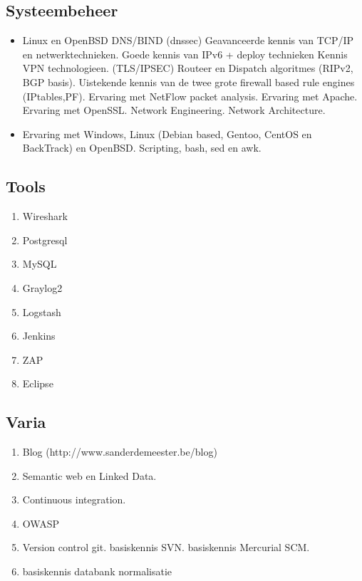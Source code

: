 \documentclass[margin, 10pt]{res} %
\begin{document}
\subsection{Systeembeheer}
\begin{itemize}
\item Linux en OpenBSD
\subitem DNS/BIND (dnssec)
\subitem Geavanceerde kennis van TCP/IP en netwerktechnieken.
\subitem Goede kennis van IPv6 + deploy technieken
\subitem Kennis VPN technologieen. (TLS/IPSEC)
\subitem Routeer en Dispatch algoritmes (RIPv2, BGP basis).
\subitem Uistekende kennis van de twee grote firewall based rule engines (IPtables,PF).
\subitem Ervaring met NetFlow packet analysis.
\subitem Ervaring met Apache.
\subitem Ervaring met OpenSSL.
\subitem Network Engineering.
\subitem Network Architecture.
\item Ervaring met Windows, Linux (Debian based, Gentoo, CentOS en BackTrack) en OpenBSD.
\subitem Scripting, bash, sed en awk.
\end{itemize}
\begin{multicols}{2}
\subsection*{Tools}
\begin{enumerate}
\item[] Wireshark
\item[] Postgresql
\item[] MySQL
\item[] Graylog2
\item[] Logstash
\item[] Jenkins
\item[] ZAP
\item[] Eclipse
\end{enumerate}
\subsection{Varia}
\begin{enumerate}
\item[] Blog (http://www.sanderdemeester.be/blog)
\item[] Semantic web en Linked Data.
\item[] Continuous integration.
\item[] OWASP
\item[] Version control
\subitem git.
\subitem basiskennis SVN.
\subitem basiskennis Mercurial SCM.
\item[] basiskennis databank normalisatie
\end{enumerate}
\end{multicols}
\end{document}
